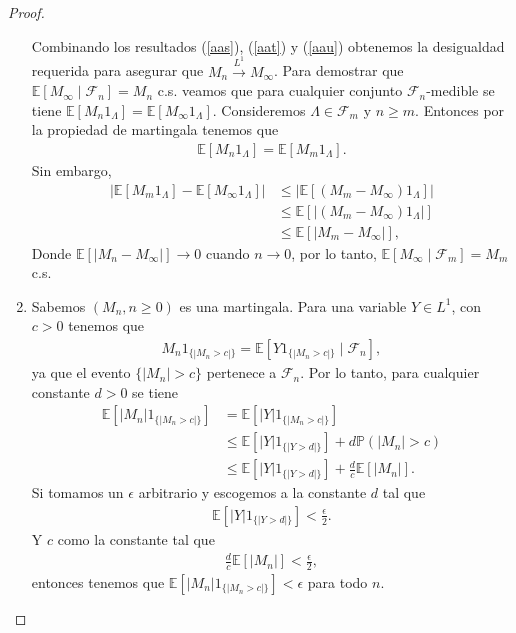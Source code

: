 \begin{proof}
\begin{enumerate}
Combinando los resultados (\ref{aas}), (\ref{aat}) y (\ref{aau}) obtenemos la desigualdad requerida para asegurar que $M_n \xrightarrow{L^1} M_{\infty}$. Para demostrar que $\mathbb{E}\left[M_{\infty} \mid \mathcal{F}_n\right] = M_n$ c.s. veamos que para cualquier conjunto $\mathcal{F}_n$-medible se tiene $\mathbb{E}[M_n 1_{\Lambda}] = \mathbb{E}[M_{\infty} 1_{\Lambda}]$. Consideremos $\Lambda \in \mathcal{F}_m$ y $n \geq m$. Entonces por la propiedad de martingala tenemos que
	\begin{align*}
	\mathbb{E}[M_n 1_{\Lambda}] = \mathbb{E}[M_m 1_{\Lambda}].
	\end{align*}
Sin embargo, 
	\begin{align*}
	|\mathbb{E}[M_m 1_{\Lambda}] - \mathbb{E}[M_{\infty} 1_{\Lambda}]| & \leq |\mathbb{E}[(M_m - M_{\infty}) 1_{\Lambda}]| \\
	& \leq \mathbb{E}[|(M_m - M_{\infty}) 1_{\Lambda}|] \\
	& \leq \mathbb{E}[|M_m - M_{\infty}|],
	\end{align*}
Donde $\mathbb{E}[|M_n - M_{\infty}|] \rightarrow 0$ cuando $n \rightarrow 0$, por lo tanto, $\mathbb{E}[M_{\infty} \mid \mathcal{F}_m] = M_m$ c.s.

\item Sabemos $(M_n, n \geq 0)$ es una martingala. Para una variable $Y \in L^1$, con $c > 0$ tenemos que
	\begin{align*}
	M_n 1_{\{|M_n > c|\}} = \mathbb{E}\left[Y1_{\{|M_n > c|\}} \mid \mathcal{F}_n\right],
	\end{align*}
ya que el evento $\{|M_n| > c\}$ pertenece a $\mathcal{F}_n$. Por lo tanto, para cualquier constante $d > 0$ se tiene
	\begin{align*}
	\mathbb{E}\left[|M_n| 1_{\{|M_n > c|\}}\right] & = \mathbb{E}\left[|Y|1_{\{|M_n > c|\}}\right] \\
	& \leq \mathbb{E}\left[|Y|1_{\{|Y > d|\}} \right] + d\mathbb{P}(|M_n| > c) \\
	& \leq \mathbb{E}\left[|Y|1_{\{|Y > d|\}} \right] + \frac{d}{c}\mathbb{E}[|M_n|].
	\end{align*}
Si tomamos un $\epsilon$ arbitrario y escogemos a la constante $d$ tal que 
	\begin{align*}
	\mathbb{E}\left[|Y|1_{\{|Y > d|\}}\right] < \frac{\epsilon}{2}.
	\end{align*}
Y $c$ como la constante tal que 
	\begin{align*}
	\frac{d}{c} \mathbb{E}[|M_n|] < \frac{\epsilon}{2},
	\end{align*}
	entonces tenemos que $\mathbb{E}[|M_n| 1_{\{|M_n > c|\}}] < \epsilon$ para todo $n$.
\end{enumerate}
\end{proof}

